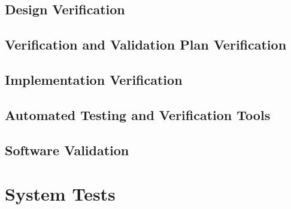\documentclass[12pt, titlepage]{article}
\begin{document}


\subsection{Design Verification}



\subsection{Verification and Validation Plan Verification}



\subsection{Implementation Verification}



\subsection{Automated Testing and Verification Tools}





\subsection{Software Validation}



\section{System Tests}
\end{document}
